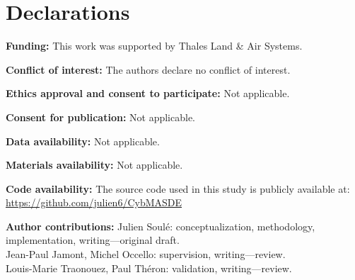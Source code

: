 \documentclass[pdflatex,sn-mathphys-num]{sn-jnl}%
\theoremstyle{thmstyleone}%
\theoremstyle{thmstyletwo}%
\theoremstyle{thmstylethree}%
\begin{document}
\section*{Declarations}
%
\begin{enumerate*}
    \item \textbf{Funding:} This work was supported by Thales Land \& Air Systems.
    \item \textbf{Conflict of interest:} The authors declare no conflict of interest.
    \item \textbf{Ethics approval and consent to participate:} Not applicable.
    \item \textbf{Consent for publication:} Not applicable.
    \item \textbf{Data availability:} Not applicable.
    \item \textbf{Materials availability:} Not applicable.
    \item \textbf{Code availability:} The source code used in this study is publicly available at: \url{https://github.com/julien6/CybMASDE}
    \item \textbf{Author contributions:} Julien Soulé: conceptualization, methodology, implementation, writing—original draft.\\
    Jean-Paul Jamont, Michel Occello: supervision, writing—review.\\
    Louis-Marie Traonouez, Paul Théron: validation, writing—review.
\end{enumerate*}

\setlength{\bibsep}{4.5pt}

\end{document}
